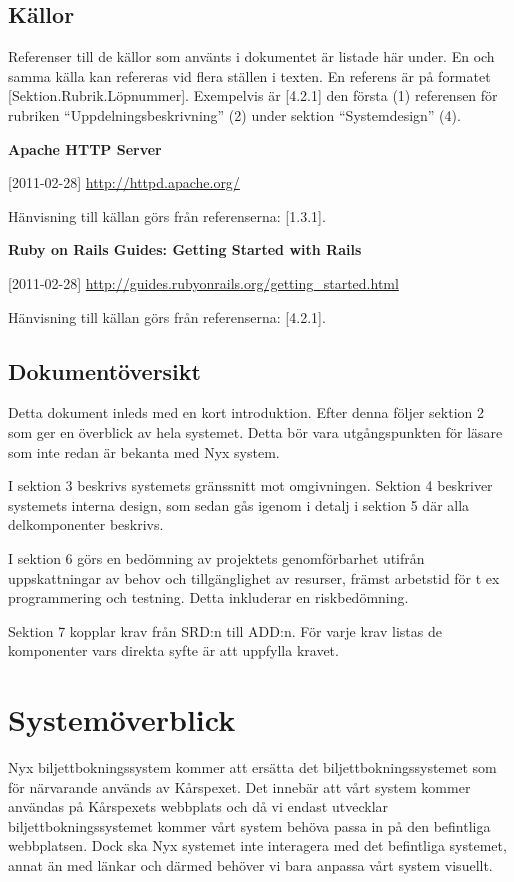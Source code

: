 \documentclass[a4paper, twoside, 11pt, titlepage]{article}
\begin{document}
	\subsection{Källor}


	Referenser till de källor som använts i dokumentet är listade här under. En och samma källa kan refereras vid flera ställen i texten. En referens är på formatet [Sektion.Rubrik.Löpnummer]. Exempelvis är [4.2.1] den första (1) referensen för rubriken ``Uppdelningsbeskrivning'' (2) under sektion ``Systemdesign'' (4).

	\textbf{Apache HTTP Server}

	[2011-02-28] \url{http://httpd.apache.org/}

	Hänvisning till källan görs från referenserna: [1.3.1].

	\textbf{Ruby on Rails Guides: Getting Started with Rails}

	[2011-02-28] \url{http://guides.rubyonrails.org/getting_started.html}

	Hänvisning till källan görs från referenserna: [4.2.1].

	\subsection{Dokumentöversikt}


	Detta dokument inleds med en kort introduktion. Efter denna följer sektion 2 som ger en överblick av hela systemet. Detta bör vara utgångspunkten för läsare som inte redan är bekanta med Nyx system.

	I sektion 3 beskrivs systemets gränssnitt mot omgivningen. Sektion 4 beskriver systemets interna design, som sedan gås igenom i detalj i sektion 5 där alla delkomponenter beskrivs.

	I sektion 6 görs en bedömning av projektets genomförbarhet utifrån uppskattningar av behov och tillgänglighet av resurser, främst arbetstid för t ex programmering och testning. Detta inkluderar en riskbedömning.

	Sektion 7 kopplar krav från SRD:n till ADD:n. För varje krav listas de komponenter vars direkta syfte är att uppfylla kravet.

\clearpage
\section{Systemöverblick}


Nyx biljettbokningssystem kommer att ersätta det biljettbokningssystemet som för närvarande används av Kårspexet. Det innebär att vårt system kommer användas på Kårspexets webbplats och då vi endast utvecklar biljettbokningssystemet kommer vårt system behöva passa in på den befintliga webbplatsen. Dock ska Nyx systemet inte interagera med det befintliga systemet, annat än med länkar och därmed behöver vi bara anpassa vårt system visuellt.
\end{document}
